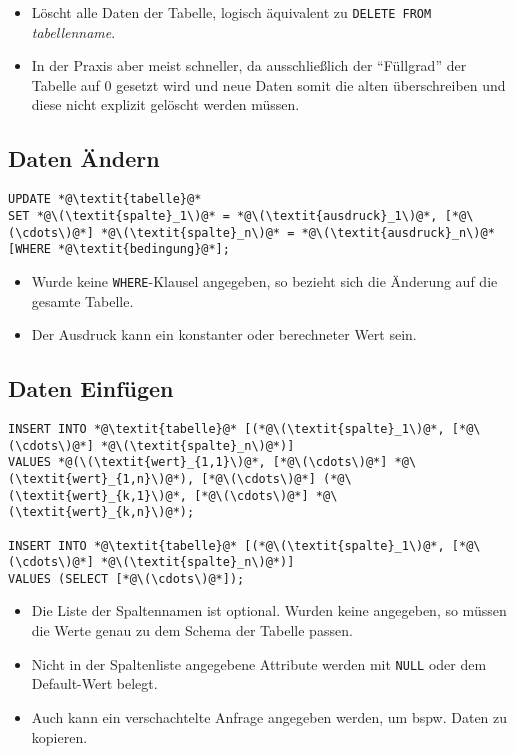                 \begin{itemize}
                	\item Löscht alle Daten der Tabelle, logisch äquivalent zu \lstinline|DELETE FROM| \textit{tabellenname}.
                	\item In der Praxis aber meist schneller, da ausschließlich der \enquote{Füllgrad} der Tabelle auf 0 gesetzt wird und neue Daten somit die alten überschreiben und diese nicht explizit gelöscht werden müssen.
                \end{itemize}

        \subsection{Daten Ändern} %
            \begin{lstlisting}
UPDATE *@\textit{tabelle}@*
SET *@\(\textit{spalte}_1\)@* = *@\(\textit{ausdruck}_1\)@*, [*@\(\cdots\)@*] *@\(\textit{spalte}_n\)@* = *@\(\textit{ausdruck}_n\)@*
[WHERE *@\textit{bedingung}@*];
            \end{lstlisting}
            
            \begin{itemize}
            	\item Wurde keine \lstinline|WHERE|-Klausel angegeben, so bezieht sich die Änderung auf die gesamte Tabelle.
            	\item Der Ausdruck kann ein konstanter oder berechneter Wert sein.
            \end{itemize}

        \subsection{Daten Einfügen} %
            \begin{lstlisting}
INSERT INTO *@\textit{tabelle}@* [(*@\(\textit{spalte}_1\)@*, [*@\(\cdots\)@*] *@\(\textit{spalte}_n\)@*)]
VALUES *@(\(\textit{wert}_{1,1}\)@*, [*@\(\cdots\)@*] *@\(\textit{wert}_{1,n}\)@*), [*@\(\cdots\)@*] (*@\(\textit{wert}_{k,1}\)@*, [*@\(\cdots\)@*] *@\(\textit{wert}_{k,n}\)@*);

INSERT INTO *@\textit{tabelle}@* [(*@\(\textit{spalte}_1\)@*, [*@\(\cdots\)@*] *@\(\textit{spalte}_n\)@*)]
VALUES (SELECT [*@\(\cdots\)@*]);
            \end{lstlisting}
            
            \begin{itemize}
            	\item Die Liste der Spaltennamen ist optional. Wurden keine angegeben, so müssen die Werte genau zu dem Schema der Tabelle passen.
            	\item Nicht in der Spaltenliste angegebene Attribute werden mit \lstinline|NULL| oder dem Default-Wert belegt.
            	\item Auch kann ein verschachtelte Anfrage angegeben werden, um bspw. Daten zu kopieren.
            \end{itemize}

